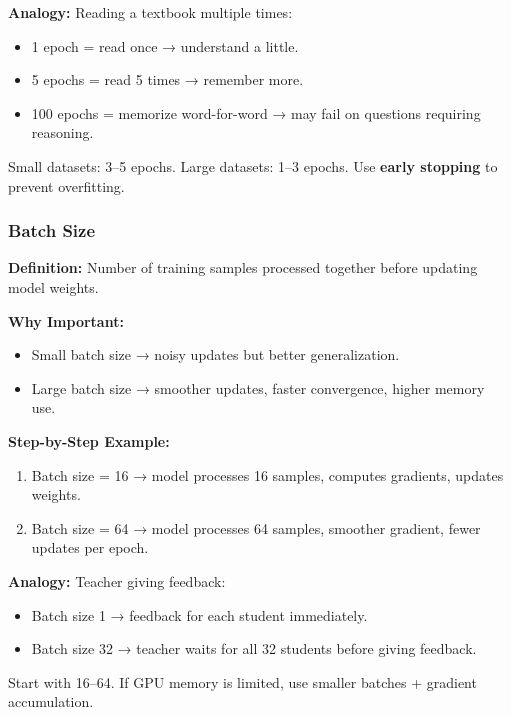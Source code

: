 \textbf{Analogy:} Reading a textbook multiple times:
\begin{itemize}
    \item 1 epoch = read once → understand a little.  
    \item 5 epochs = read 5 times → remember more.  
    \item 100 epochs = memorize word-for-word → may fail on questions requiring reasoning.  
\end{itemize}

\begin{tcolorbox}[colback=orange!5,colframe=orange!70!black,title=Rule of Thumb]
Small datasets: 3--5 epochs.  
Large datasets: 1--3 epochs.  
Use \textbf{early stopping} to prevent overfitting.
\end{tcolorbox}



\subsubsection{Batch Size}
\textbf{Definition:} Number of training samples processed together before updating model weights.  

\textbf{Why Important:}  
\begin{itemize}
    \item Small batch size → noisy updates but better generalization.  
    \item Large batch size → smoother updates, faster convergence, higher memory use.  
\end{itemize}

\textbf{Step-by-Step Example:}
\begin{enumerate}
    \item Batch size = 16 → model processes 16 samples, computes gradients, updates weights.  
    \item Batch size = 64 → model processes 64 samples, smoother gradient, fewer updates per epoch.  
\end{enumerate}

\textbf{Analogy:} Teacher giving feedback:  
\begin{itemize}
    \item Batch size 1 → feedback for each student immediately.  
    \item Batch size 32 → teacher waits for all 32 students before giving feedback.  
\end{itemize}

\begin{tcolorbox}[colback=green!5,colframe=green!70!black,title=Rule of Thumb]
Start with 16--64.  
If GPU memory is limited, use smaller batches + gradient accumulation.
\end{tcolorbox}


